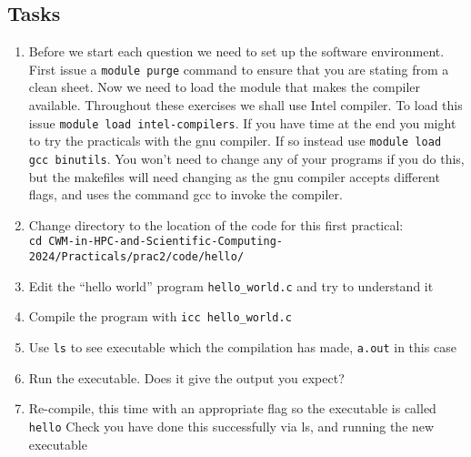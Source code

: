 \documentclass[a4paper, 12pt]{article}
\def \cc   {\tt }               %
\begin{document}
\subsection*{Tasks}

\begin{enumerate}

  \item Before we start each question we need to set up the software 
    environment. First issue a {\cc module purge} command to ensure
    that you are stating from a clean sheet. Now we need to load
    the module that makes the compiler available.
    Throughout these exercises we shall use Intel compiler. To load this issue 
    {\cc module load intel-compilers}. If you have time at the end
    you might to try the practicals with the gnu
    compiler. If so instead use {\cc module load gcc binutils}.
    You won't need to change any of your programs if you do this, but the
    makefiles will need changing as the gnu compiler accepts different flags, and uses
    the command gcc to invoke the compiler.
  \item Change directory to the location of the code for this ﬁrst practical:\\
{\cc cd CWM-in-HPC-and-Scientific-Computing-2024/Practicals/prac2/code/hello/}

  \item Edit the ``hello world'' program {\cc hello\_world.c} and try to understand it

  \item Compile the program with {\cc icc hello\_world.c}

  \item Use \texttt{ls} to see executable which the compilation has made, {\cc a.out} in this case

  \item Run the executable. Does it give the output you expect?

  \item Re-compile, this time with an appropriate flag so the executable is called {\cc hello}
    Check you have done this successfully via ls, and running the new executable

\end{enumerate}


\end{document}
